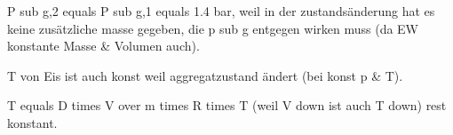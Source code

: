 P sub g,2 equals P sub g,1 equals 1.4 bar, weil in der zustandsänderung hat es keine zusätzliche masse gegeben, die p sub g entgegen wirken muss (da EW konstante Masse & Volumen auch).

T von Eis ist auch konst weil aggregatzustand ändert (bei konst p & T).

T equals D times V over m times R times T (weil V down ist auch T down) rest konstant.